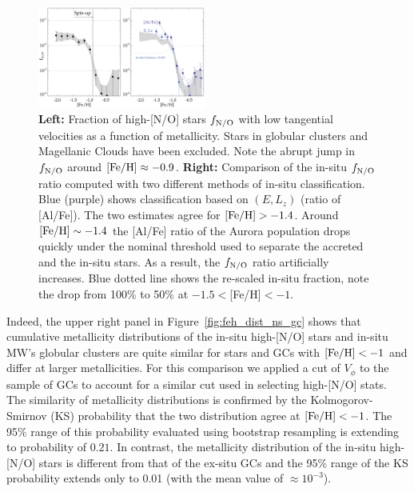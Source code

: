 \documentclass[a4paper,useAMS,usenatbib]{mnras}
\begin{document}
%
\begin{figure}
  \centering
  \includegraphics[width=0.49\textwidth]{img/fraction_feh.pdf}
  \caption[]{{\bf Left:} Fraction of high-[N/O] stars $f_{\rm N/O}$ with low tangential velocities as a function of metallicity. Stars in globular clusters and Magellanic Clouds have been excluded. Note the abrupt jump in $f_{\rm N/O}$ around $\rm [Fe/H]\approx-0.9$. {\bf Right:} Comparison of the in-situ $f_{\rm N/O}$ ratio computed with two different methods of in-situ classification. Blue (purple) shows classification based on $(E,L_z)$ (ratio of [Al/Fe]). The two estimates agree for $\rm [Fe/H]>-1.4$. Around $\rm [Fe/H]\sim-1.4$ the [Al/Fe] ratio of the Aurora population drops quickly under the nominal threshold used to separate the accreted and the in-situ stars. As a result, the $f_{\rm N/O}$ ratio artificially increases. Blue dotted line shows the re-scaled in-situ fraction, note the drop from 100\% to 50\% at $-1.5<$[Fe/H]$<-1$.}
   \label{fig:frac_feh}
\end{figure}
%

Indeed, the upper right panel in Figure~\ref{fig:feh_dist_ns_gc} shows that cumulative metallicity distributions of the in-situ high-[N/O] stars and in-situ MW's globular clusters are quite similar for stars and GCs with $\rm [Fe/H]<-1$ and differ at larger metallicities. For this comparison we applied a cut of $V_{\phi}$ to the sample of GCs to account for a similar cut used in selecting high-[N/O] stats. The similarity of metallicity distributions is confirmed by the Kolmogorov-Smirnov (KS) probability that the two distribution agree at $\rm [Fe/H]<-1$. The 95\% range of this probability evaluated using bootstrap resampling is extending to probability of $0.21$. In contrast, the metallicity distribution of the in-situ high-[N/O] stars is different from that of the ex-situ GCs and the 95\% range of the KS probability extends only to 0.01 (with the mean value of $\approx 10^{-3}$). 
\end{document}
